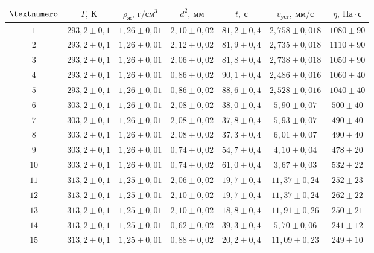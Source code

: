 \begin{tabular}{|c|c|c|c|c|c|c|}
  \hline
  $\textnumero$ & $T,\ К$ & $\rho_{\text{ж}},\ г/см^3$ & $d^2,\ мм$ & $t,\ с$ & $v_{\text{уст}},\ мм/с$ & $\eta,\ Па \cdot с$\\ \hline
  $1$ & $293,2 \pm 0,1$ & $1,26 \pm 0,01$ & $2,10 \pm 0,02$ & $81,2 \pm 0,4$ & $2,758 \pm 0,018$ & $1080 \pm 90$\\ \hline
  $2$ & $293,2 \pm 0,1$ & $1,26 \pm 0,01$ & $2,12 \pm 0,02$ & $81,9 \pm 0,4$ & $2,735 \pm 0,018$ & $1110 \pm 90$\\ \hline
  $3$ & $293,2 \pm 0,1$ & $1,26 \pm 0,01$ & $2,06 \pm 0,02$ & $81,8 \pm 0,4$ & $2,738 \pm 0,018$ & $1050 \pm 90$\\ \hline
  $4$ & $293,2 \pm 0,1$ & $1,26 \pm 0,01$ & $0,86 \pm 0,02$ & $90,1 \pm 0,4$ & $2,486 \pm 0,016$ & $1060 \pm 40$\\ \hline
  $5$ & $293,2 \pm 0,1$ & $1,26 \pm 0,01$ & $0,86 \pm 0,02$ & $88,6 \pm 0,4$ & $2,528 \pm 0,016$ & $1040 \pm 40$\\ \hline
  
  $6$ & $303,2 \pm 0,1$ & $1,26 \pm 0,01$ & $2,08 \pm 0,02$ & $38,0 \pm 0,4$ & $5,90 \pm 0,07$ & $500 \pm 40$\\ \hline
  $7$ & $303,2 \pm 0,1$ & $1,26 \pm 0,01$ & $2,08 \pm 0,02$ & $37,8 \pm 0,4$ & $5,93 \pm 0,07$ & $490 \pm 40$\\ \hline
  $8$ & $303,2 \pm 0,1$ & $1,26 \pm 0,01$ & $2,08 \pm 0,02$ & $37,3 \pm 0,4$ & $6,01 \pm 0,07$ & $490 \pm 40$\\ \hline
  $9$ & $303,2 \pm 0,1$ & $1,26 \pm 0,01$ & $0,74 \pm 0,02$ & $54,7 \pm 0,4$ & $4,10 \pm 0,04$ & $478 \pm 20$\\ \hline
  $10$ & $303,2 \pm 0,1$ & $1,26 \pm 0,01$ & $0,74 \pm 0,02$ & $61,0 \pm 0,4$ & $3,67 \pm 0,03$ & $532 \pm 22$\\ \hline

  $11$ & $313,2 \pm 0,1$ & $1,25 \pm 0,01$ & $2,06 \pm 0,02$ & $19,7 \pm 0,4$ & $11,37 \pm 0,24$ & $252 \pm 23$\\ \hline
  $12$ & $313,2 \pm 0,1$ & $1,25 \pm 0,01$ & $2,10 \pm 0,02$ & $19,7 \pm 0,4$ & $11,37 \pm 0,24$ & $262 \pm 22$\\ \hline
  $13$ & $313,2 \pm 0,1$ & $1,25 \pm 0,01$ & $2,10 \pm 0,02$ & $18,8 \pm 0,4$ & $11,91 \pm 0,26$ & $250 \pm 21$\\ \hline
  $14$ & $313,2 \pm 0,1$ & $1,25 \pm 0,01$ & $0,62 \pm 0,02$ & $39,3 \pm 0,4$ & $5,70 \pm 0,06$ & $241 \pm 12$\\ \hline
  $15$ & $313,2 \pm 0,1$ & $1,25 \pm 0,01$ & $0,88 \pm 0,02$ & $20,2 \pm 0,4$ & $11,09 \pm 0,23$ & $249 \pm 10$\\ \hline
  

\end{tabular}

